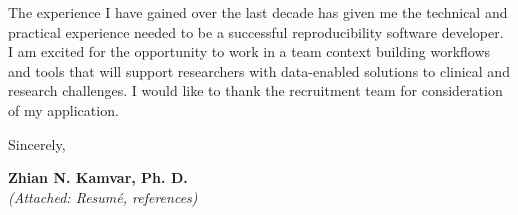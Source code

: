 \vspace{2ex}

The experience I have gained over the last decade has given me the technical and
practical experience needed to be a successful reproducibility software developer. I am
excited for the opportunity to work in a team context building workflows and tools that will
support researchers with data-enabled solutions to clinical and research challenges. I would like to
thank the recruitment team for consideration of my application.

\vspace{3ex}

Sincerely,

\vspace{4ex}

\textbf{Zhian N. Kamvar, Ph. D.}\\
{\footnotesize \textit{(Attached: Resum\'{e}, references)}}

\clearpage



